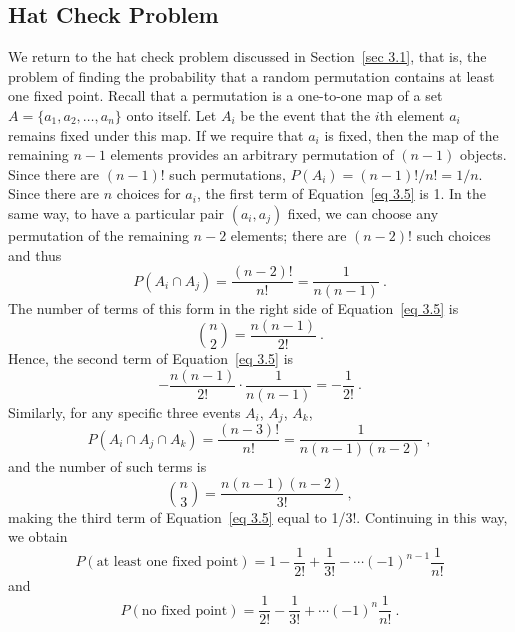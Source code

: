 \subsection*{Hat Check Problem}

\begin{example}\label{exam 3.13}  We return to the hat check problem
discussed in Section~\ref{sec 3.1}, that is, the problem of finding the probability that a random
permutation contains  at least one fixed point.  Recall that a permutation is a
one-to-one map of a set
$A = \{a_1,a_2,\dots,a_n\}$ onto itself.  Let $A_i$ be the event that the $i$th
element $a_i$ remains fixed under this map.  If we require that $a_i$ is fixed, then
the map of the remaining $n - 1$ elements provides an arbitrary permutation of $(n -
1)$ objects.  Since there are $(n - 1)!$ such permutations, $P(A_i) = (n - 1)!/n! =
1/n$.  Since there are $n$ choices for
$a_i$, the first term of Equation~\ref{eq 3.5} is 1.  In
the same way, to have a particular pair $(a_i,a_j)$ fixed, we can choose  any
permutation of the remaining $n - 2$ elements; there are $(n - 2)!$ such choices and
thus
$$ P(A_i \cap A_j) = \frac{(n - 2)!}{n!} = \frac 1{n(n - 1)}\ .
$$ The number of terms of this form in the right side of Equation~\ref{eq 3.5} is $$ {n
\choose 2} = \frac{n(n - 1)}{2!}\ .
$$ Hence, the second term of Equation~\ref{eq 3.5} is
$$ -\frac{n(n - 1)}{2!} \cdot \frac 1{n(n - 1)} = -\frac 1{2!}\ .
$$ Similarly, for any specific three events $A_i$, $A_j$, $A_k$,
$$ P(A_i \cap A_j \cap A_k) = \frac{(n - 3)!}{n!} = \frac 1{n(n - 1)(n - 2)}\ ,
$$ and the number of such terms is
$$ {n \choose 3} = \frac{n(n - 1)(n - 2)}{3!}\ ,
$$ making the third term of Equation~\ref{eq 3.5} equal to
1/3!.  Continuing in this way, we obtain
$$ P(\mbox {at\ least\ one\ fixed\ point}) = 1 - \frac 1{2!} + \frac 1{3!} - \cdots
(-1)^{n-1} \frac 1{n!}
$$ and
$$ P(\mbox {no\ fixed\ point}) = \frac 1{2!} - \frac 1{3!} + \cdots (-1)^n \frac 1{n!}\ .
$$


\end{example}
